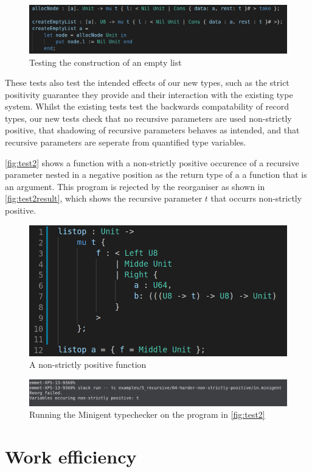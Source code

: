 \begin{figure}
    \centering
    \includegraphics[width=\linewidth]{content/test1.png}
    \caption{Testing the construction of an empty list }
    \label{fig:test1}
\end{figure}

These tests also test the intended effects of our new types, such as the strict positivity guarantee they provide
and their interaction with the existing type system. Whilst the existing tests test the backwards compatability of
record types, our new tests check that no recursive parameters are used non-strictly positive, that shadowing of recursive
parameters behaves as intended, and that recursive parameters are seperate from quantified type variables.

\autoref{fig:test2} shows a function with a non-strictly positive occurence of a recursive parameter nested in 
a negative position as the return type of a a function that is an argument. This program is rejected by the reorganiser
as shown in \autoref{fig:test2result}, which shows the recursive parameter $t$ that occurrs non-strictly positive.

\begin{figure}
    \centering
    \includegraphics[width=0.8\linewidth]{content/test2.png}
    \caption{A non-strictly positive function}
    \label{fig:test2}
\end{figure}

\begin{figure}
    \centering
    \includegraphics[width=\linewidth]{content/test2result.png}
    \caption{Running the Minigent typechecker on the program in \autoref{fig:test2}}
    \label{fig:test2result}
\end{figure}

\section{Work efficiency}

